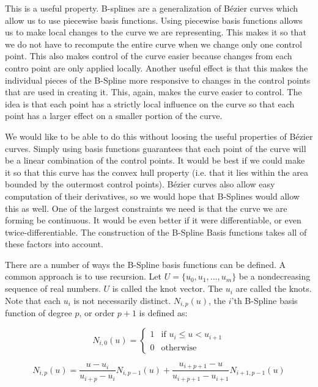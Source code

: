 This is a useful property.
B-splines are a generalization of B\'{e}zier curves which allow us to use piecewise basis functions.
Using piecewise basis functions allows us to make local changes to the curve we are representing.
This makes it so that we do not have to recompute the entire curve when we change only one control point.
This also makes control of the curve easier because changes from each contro point are only applied locally.
Another useful effect is that this makes the individual pieces of the B-Spline more responsive to changes in the control points that are used in creating it.
This, again, makes the curve easier to control.
The idea is that each point has a strictly local influence on the curve so that each point has a larger effect on a smaller portion of the curve.

We would like to be able to do this without loosing the useful properties of B\'{e}zier curves.
Simply using basis functions guarantees that each point of the curve will be a linear combination of the control points.
It would be best if we could make it so that this curve has the convex hull property (i.e. that it lies within the area bounded by the outermost control points).
B\'{e}zier curves also allow easy computation of their derivatives, so we would hope that B-Splines would allow this as well.
One of the largest constraints we need is that the curve we are forming be continuous.
It would be even better if it were differentiable, or even twice-differentiable.
The construction of the B-Spline Basis functions takes all of these factors into account.

There are a number of ways the B-Spline basis functions can be defined.
A common approach is to use recursion.
Let $U = \lbrace u_0, u_1, ... , u_m \rbrace$ be a nondecreasing sequence of real numbers.
$U$ is called the knot vector.
The $u_i$ are called the knots.
Note that each $u_i$ is not necessarily distinct.
$N_{i,p}(u)$, the $i$'th B-Spline basis function of degree $p$, or order $p+1$ is defined as:

\begin{equation}
N_{i,0}(u) = 
\begin{cases}
1 & \text{if } u_i \leq u < u_{i+1} \\
0 & \text{otherwise}
\end{cases}
\end{equation}

\begin{equation}
N_{i,p}(u) = \frac{u - u_i}{u_{i+p} - u_i} N_{i,p-1}(u) + \frac{u_{i + p + 1} - u}{u_{i + p + 1} - u_{i + 1}} N_{i+1,p-1}(u)
\end{equation}

